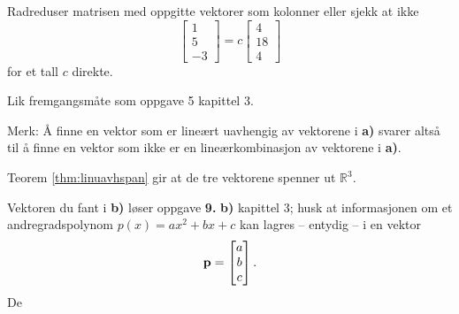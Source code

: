 \begin{losning}

\begin{punkt}
Radreduser matrisen med oppgitte vektorer som kolonner eller sjekk at ikke $$\begin{bmatrix}
1\\
5\\
-3
\end{bmatrix}=c\begin{bmatrix}
4\\
18\\
4
\end{bmatrix}$$ for et tall $c$ direkte.
\end{punkt}

\begin{punkt}
Lik fremgangsmåte som oppgave 5 kapittel 3.

\noindent
Merk: Å finne en vektor som er lineært uavhengig av vektorene i \textbf{a)} svarer altså til å finne en vektor som ikke er en lineærkombinasjon av vektorene i \textbf{a)}. 
\end{punkt}

\begin{punkt}
Teorem \ref{thm:linuavhspan} gir at de tre vektorene spenner ut $\mathbb{R}^3$.

Vektoren du fant i \textbf{b)} løser oppgave \textbf{9.} \textbf{b)} kapittel 3; husk at informasjonen om et andregradspolynom $p(x)=ax^2+bx+c$ kan lagres -- entydig -- i en vektor $$\mathbf{p}=\begin{bmatrix}
a\\
b\\
c
\end{bmatrix}.$$ De
\end{punkt}

\end{losning}







